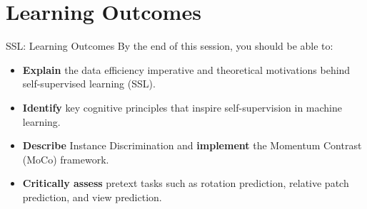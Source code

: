 \section{Learning Outcomes}
\begin{frame}{SSL: Learning Outcomes}
    By the end of this session, you should be able to:
    \begin{itemize}
        \item \textbf{Explain} the data efficiency imperative and theoretical motivations behind self-supervised learning (SSL).
        \item \textbf{Identify} key cognitive principles that inspire self-supervision in machine learning.
        \item \textbf{Describe} Instance Discrimination and \textbf{implement} the Momentum Contrast (MoCo) framework.
        \item \textbf{Critically assess} pretext tasks such as rotation prediction, relative patch prediction, and view prediction.
    \end{itemize}
\end{frame}